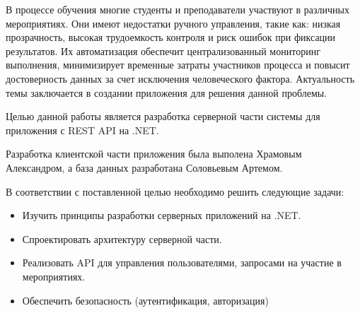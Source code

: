 \intro

В процессе обучения многие студенты и преподаватели участвуют в различных мероприятиях. Они имеют недостатки ручного управления, такие как: низкая прозрачность, высокая трудоемкость контроля и риск ошибок при фиксации результатов. Их автоматизация обеспечит централизованный мониторинг выполнения, минимизирует временные затраты участников процесса и повысит достоверность данных за счет исключения человеческого фактора. Актуальность темы заключается в создании приложения для решения данной проблемы.

Целью данной работы является разработка серверной части системы для приложения \guillemetright с REST API на .NET.

Разработка клиентской части приложения была выполена Храмовым Александром, а база данных разработана Соловьевым Артемом.

В соответствии с поставленной целью необходимо решить следующие задачи:

\begin{itemize}
	\item{Изучить принципы разработки серверных приложений на .NET.}
	\item{Спроектировать архитектуру серверной части.}
	\item{Реализовать API для управления пользователями, запросами на участие в мероприятиях.}
	\item{Обеспечить безопасность (аутентификация, авторизация)}
\end{itemize}
